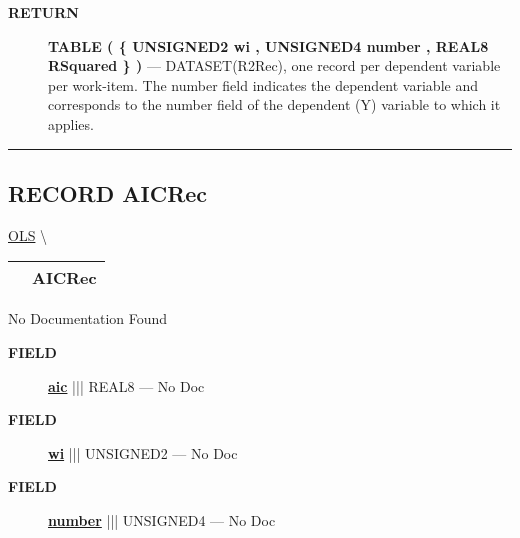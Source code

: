 \par
\begin{description}
\item [\colorbox{tagtype}{\color{white} \textbf{\textsf{RETURN}}}] \textbf{TABLE ( \{ UNSIGNED2 wi , UNSIGNED4 number , REAL8 RSquared \} )} --- DATASET(R2Rec), one record per dependent variable per work-item. The number field indicates the dependent variable and corresponds to the number field of the dependent (Y) variable to which it applies.
\end{description}




\rule{\linewidth}{0.5pt}
\subsection*{\textsf{\colorbox{headtoc}{\color{white} RECORD}
AICRec}}

\hypertarget{ecldoc:linearregression.ols.aicrec}{}
\hspace{0pt} \hyperlink{ecldoc:linearregression.ols}{OLS} \textbackslash 

{\renewcommand{\arraystretch}{1.5}
\begin{tabularx}{\textwidth}{|>{\raggedright\arraybackslash}l|X|}
\hline
\hspace{0pt}\mytexttt{\color{red} } & \textbf{AICRec} \\
\hline
\end{tabularx}
}

\par





No Documentation Found







\par
\begin{description}
\item [\colorbox{tagtype}{\color{white} \textbf{\textsf{FIELD}}}] \textbf{\underline{aic}} ||| REAL8 --- No Doc
\item [\colorbox{tagtype}{\color{white} \textbf{\textsf{FIELD}}}] \textbf{\underline{wi}} ||| UNSIGNED2 --- No Doc
\item [\colorbox{tagtype}{\color{white} \textbf{\textsf{FIELD}}}] \textbf{\underline{number}} ||| UNSIGNED4 --- No Doc
\end{description}





